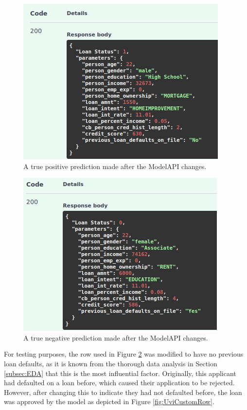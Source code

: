 \documentclass[12pt]{report}
\begin{document}
\begin{figure}[H]
    \centering
    \includegraphics[width=.75\linewidth]{Implementation/JAN 10 UPDATES/NewTruePositiveOutput.png}
    \caption{A true positive prediction made after the ModelAPI changes.}
    \label{fig:TruePositiveNew}
\end{figure}

\begin{figure}[H]
    \centering
    \includegraphics[width=.75\linewidth]{Implementation/JAN 10 UPDATES/NewTrueNegativeOutput.png}
    \caption{A true negative prediction made after the ModelAPI changes.}
    \label{fig:TrueNegativeNew}
\end{figure}

\noindent For testing purposes, the row used in Figure \ref{fig:TrueNegativeNew} was modified to have no previous loan 
defaults, as it is known from the thorough data analysis in Section \ref{subsec:EDA} that this is the most influential 
factor. Originally, this applicant had defaulted on a loan before, which caused their application to be rejected. However,
after changing this to indicate they had not defaulted before, the loan was approved by the model as depicted in Figure 
\ref{fig:UviCustomRow}.
\end{document}
